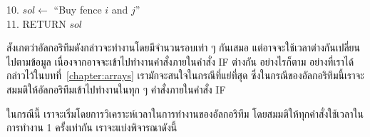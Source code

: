 \begin{algt}
10.\settowidth{\algbackindent}{10.}\hspace*{-\algbackindent}\hspace*{0.2in}\hspace*{0.2in}\hspace*{0.2in}\hspace*{0.2in} $sol\leftarrow$ ``Buy fence $i$ and $j$''\\
11.\settowidth{\algbackindent}{11.}\hspace*{-\algbackindent}\hspace*{0.2in} RETURN $sol$
\end{algt}

สังเกต{\wbr}ว่า{\wbr}อัล{\wbr}กอ{\wbr}ริ{\wbr}ทึม{\wbr}ดังกล่าว{\wbr}จะ{\wbr}ทำงาน{\wbr}โดย{\wbr}มี{\wbr}จำนวน{\wbr}รอบ{\wbr}เท่า ๆ กัน{\wbr}เสมอ{\wbr}
แต่{\wbr}อาจ{\wbr}จะ{\wbr}ใช้เวลา{\wbr}ต่าง{\wbr}กัน{\wbr}เปลี่ยน{\wbr}ไป{\wbr}ตาม{\wbr}ข้อมูล เนื่องจาก{\wbr}อาจ{\wbr}จะ{\wbr}เข้า{\wbr}ไป{\wbr}ทำงาน{\wbr}คำสั่ง{\wbr}ภายใน{\wbr}คำสั่ง{\wbr}
IF ต่าง{\wbr}กัน อย่างไรก็ตาม อย่าง{\wbr}ที่{\wbr}เรา{\wbr}ได้{\wbr}กล่าว{\wbr}ไว้{\wbr}ใน{\wbr}บท{\wbr}ที่~\ref{chapter:arrays}
เรา{\wbr}มักจะ{\wbr}สนใจ{\wbr}ใน{\wbr}กรณี{\wbr}ที่{\wbr}แย่{\wbr}ที่สุด{\wbr}
ซึ่ง{\wbr}ใน{\wbr}กรณี{\wbr}ของ{\wbr}อัล{\wbr}กอ{\wbr}ริ{\wbr}ทึม{\wbr}นี้{\wbr}เรา{\wbr}จะ{\wbr}สมมติ{\wbr}ให้{\wbr}อัล{\wbr}กอ{\wbr}ริ{\wbr}ทึม{\wbr}เข้า{\wbr}ไป{\wbr}ทำงาน{\wbr}ใน{\wbr}ทุก ๆ คำสั่ง{\wbr}ภายใน{\wbr}คำสั่ง IF

ใน{\wbr}กรณี{\wbr}นี้ เรา{\wbr}จะ{\wbr}เริ่ม{\wbr}โดย{\wbr}การ{\wbr}วิเคราะห์{\wbr}เวลา{\wbr}ใน{\wbr}การ{\wbr}ทำงาน{\wbr}ของ{\wbr}อัล{\wbr}กอ{\wbr}ริ{\wbr}ทึม{\wbr}
โดย{\wbr}สมมติ{\wbr}ให้{\wbr}ทุก{\wbr}คำสั่ง{\wbr}ใช้เวลา{\wbr}ใน{\wbr}การ{\wbr}ทำงาน 1 ครั้ง{\wbr}เท่า{\wbr}กัน เรา{\wbr}จะ{\wbr}แบ่ง{\wbr}พิจารณา{\wbr}ดังนี้{\wbr}

